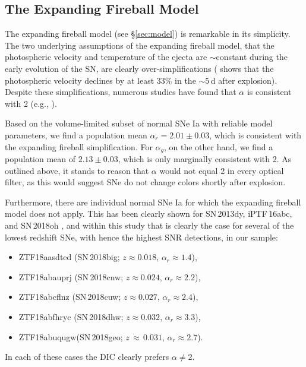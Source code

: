 \documentclass[twocolumn]{aastex63}
\begin{document}
\subsection{The Expanding Fireball Model}\label{sec:fireball_discussion}

The expanding fireball model (see \S\ref{sec:model}) is remarkable in its
simplicity. The two underlying assumptions of the expanding fireball model,
that the photospheric velocity and temperature of the ejecta are
$\sim$constant during the early evolution of the SN, are clearly
over-simplifications (\citealt{Parrent12} shows that the photospheric velocity
declines by at least 33\% in the $\sim$5\,d after explosion). Despite these
simplifications, numerous studies have found that $\alpha$ is consistent with
2 (e.g.,
\citealt{Conley06,Hayden10,Ganeshalingam11,Gonzalez-Gaitan12,Zheng17a}).

Based on the volume-limited subset of normal SNe Ia with reliable model
parameters, we find a population mean $\alpha_r = 2.01 \pm 0.03$, which is
consistent with the expanding fireball simplification. For $\alpha_g$, on the
other hand, we find a population mean of $2.13 \pm 0.03$, which is only
marginally consistent with 2. As outlined above, it stands to reason that
$\alpha$ would not equal 2 in every optical filter, as this would suggest SNe
do not change colors shortly after explosion.

Furthermore, there are individual normal SNe Ia for which the expanding
fireball model does not apply. This has been clearly shown for SN\,2013dy,
iPTF\,16abc, and SN\,2018oh \citep{Zheng13,Miller18,Shappee19,Dimitriadis19},
and within this study that is clearly the case for several of the lowest
redshift SNe, with hence the highest SNR detections, in our sample:
% 
\begin{itemize}
\item ZTF18aasdted (SN\,2018big; $z \approx 0.018$, $\alpha_r \approx 1.4$),
\item ZTF18abauprj (SN\,2018cnw; $z \approx 0.024$, $\alpha_r \approx 2.2$),
\item ZTF18abcflnz (SN\,2018cuw; $z \approx 0.027$, $\alpha_r \approx 2.4$),
\item ZTF18abfhryc (SN\,2018dhw; $z \approx 0.032$, $\alpha_r \approx 3.3$), 
\item ZTF18abuqugw\;(SN\,2018geo; $z\,\approx\,0.031$, $\alpha_r\approx2.7$).
\end{itemize}
% 
 In each of these cases the DIC clearly prefers $\alpha \neq 2$.
\end{document}

